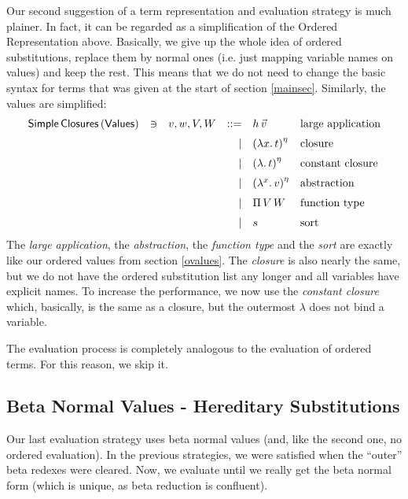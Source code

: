 \documentclass[12pt, a4paper, titlepage]{article}
\newcommand{\sspace}{\,}
\newcommand{\la}{\lambda}
\newcommand{\emphSec}[1]{#1}
\newcommand{\ClosS}[3]{\left(\la {#1}. \sspace #2 \right)^{#3}}
\newcommand{\KS}[2]{\left(\la . \sspace #1 \right)^{#2}}
\newcommand{\FunS}[2]{\Pi \sspace #1 \sspace #2}
\newcommand{\AbsS}[3]{\left( \la^{#1}. \sspace {#2} \right)^{#3}}
\begin{document}
Our second suggestion of a term representation and evaluation strategy is much plainer. %
In fact, it can be regarded as a simplification of the Ordered Representation above.
Basically, we give up the whole idea of ordered substitutions, replace them by normal ones (i.e. just mapping variable names on values) and keep the rest. This means that we do not need to change the basic syntax for terms that was given at the start of section \ref{mainsec}. Similarly, the values are simplified:
\[
\begin{array}{lllrll}
\mathsf{Simple \, Closures \, (Values)}      & \ni & v,w,V,W & ::= & h \sspace \vec v & \mbox{large application} \\ 
\noalign{\medskip}
			                   &&& \mid & \ClosS x t {\eta} & \mbox{closure} \\ 
\noalign{\medskip}
			                   &&& \mid & \KS t \eta & \mbox{constant closure} \\ 
\noalign{\medskip}
			                   &&& \mid & \AbsS x v \eta & \mbox{abstraction} \\
\noalign{\medskip}
			                   &&& \mid & \FunS V W & \mbox{function type} \\
\noalign{\medskip}
			                   &&& \mid & s & \mbox{sort}
\end{array}
\]
The \emph{large application}, the \emph{abstraction}, the \emph{function type} and the \emph{sort} are exactly like our ordered values from section \ref{ovalues}. The \emph{closure} is also nearly the same, but we do not have the ordered substitution list any longer and all variables have explicit names. To increase the performance, we now use the \emph{constant closure} which, basically, is the same as a \emphSec{closure}, but the outermost $\la$ does not bind a variable.

The evaluation process is completely analogous to the evaluation of ordered terms. For this reason, we skip it.


\subsection{Beta Normal Values - Hereditary Substitutions}

Our last evaluation strategy uses beta normal values (and, like the second one, no ordered evaluation). In the previous strategies, we were satisfied when the ``outer'' beta redexes were cleared. Now, we evaluate until we really get the beta normal form (which is unique, as beta reduction is confluent).
\end{document}
